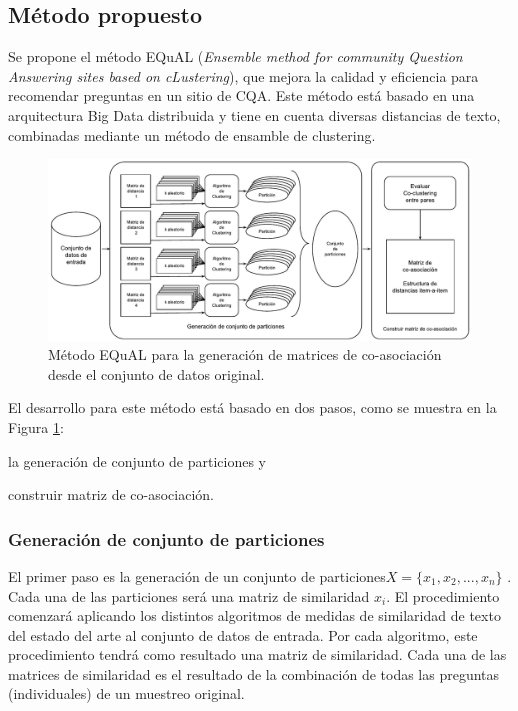 \subsection{Método propuesto}
Se propone el método EQuAL (\textit{Ensemble method for community Question Answering sites based on cLustering}), que mejora la calidad y eficiencia para recomendar preguntas en un sitio de CQA. Este método está basado en una arquitectura Big Data distribuida y tiene en cuenta diversas distancias de texto, combinadas mediante un método de ensamble de clustering.

\begin{figure}[h!]
	\centering
	\includegraphics[width=0.9\linewidth]{8_problema_investigacion/imagenes/metodo_equal}
	\caption{Método EQuAL para la generación de matrices de co-asociación desde el conjunto de datos original.}
	\label{fig:metodoequal}
\end{figure}

 El desarrollo para este método está basado en dos pasos, como se muestra en la Figura \ref{fig:metodoequal}: \begin{enumerate*} [label=(\roman*)] \item la generación de conjunto de particiones y \item construir matriz de co-asociación. \end{enumerate*}

\subsubsection{Generación de conjunto de particiones}
El primer paso es la generación de un conjunto de particiones\(X = \{x_1, x_2,... , x_n\}\) . Cada una de las particiones será una matriz de similaridad \(x_i\). El procedimiento comenzará aplicando los distintos algoritmos de medidas de similaridad de texto del estado del arte al conjunto de datos de entrada. Por cada algoritmo, este procedimiento tendrá como resultado una matriz de similaridad. Cada una de las matrices de similaridad es el resultado de la combinación de todas las preguntas (individuales) de un muestreo original.

